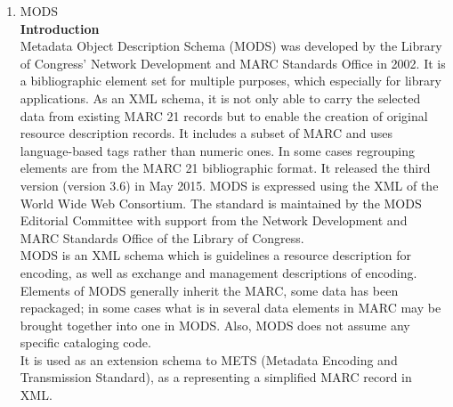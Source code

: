 \begin{enumerate}
	
	\item MODS\\
	{\bf Introduction}\\
	Metadata Object Description Schema (MODS) was developed by the Library of Congress' Network Development and MARC Standards Office in 2002. 
	It is a bibliographic element set for multiple purposes, which especially for library applications. 
	As an XML schema, it is not only able to carry the selected data from existing MARC 21 records but to enable the creation of original resource description records. 
	It includes a subset of MARC and uses language-based tags rather than numeric ones. In some cases regrouping elements are from the MARC 21 bibliographic format. 
	It released the third version (version 3.6) in May 2015. MODS is expressed using the XML of the World Wide Web Consortium. 
	The standard is maintained by the MODS Editorial Committee with support from the Network Development and MARC Standards Office of the Library of Congress.\\
	
	MODS is an XML schema which is guidelines a resource description for encoding, as well as exchange and management descriptions of encoding.\\
	
	Elements of MODS generally inherit the MARC, some data has been repackaged; in some cases what is in several data elements in MARC may be brought together into one in MODS. Also, MODS does not assume any specific cataloging code.\\ 
	It is used as an extension schema to METS (Metadata Encoding and Transmission Standard), as a representing a simplified MARC record in XML.
	

\end{enumerate}

